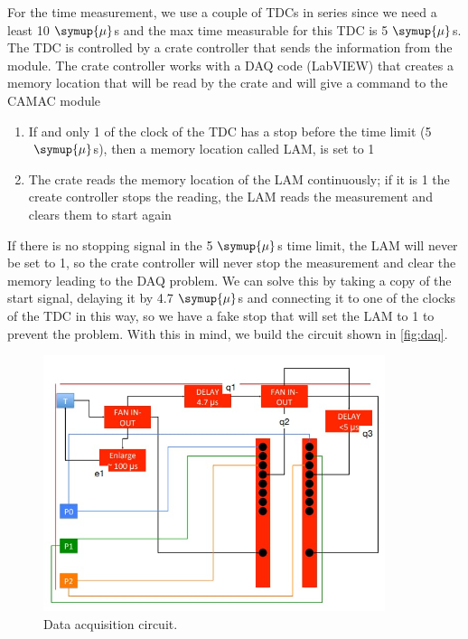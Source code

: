For the time measurement, we use a couple of TDCs in series since we need a least 10$\;\symup{\mu}$s
and the max time measurable for this TDC is 5$\;\symup{\mu}$s.
The TDC is controlled by a crate controller that sends the information 
from the module. The crate controller works with a DAQ code (LabVIEW) 
that creates a memory location that will be read by the crate and will give a command to the
CAMAC module
\begin{enumerate}
  \item If and only 1 of the clock of the TDC has a stop before the time limit (5$\;\symup{\mu}$s), then a memory location called LAM, is set to 1
  \item The crate reads the memory location of the LAM continuously; if it is 1 the create controller stops the reading, the LAM reads the measurement and clears them to start again
\end{enumerate}
 If there is no stopping signal in the 5$\;\symup{\mu}$s time limit, the LAM will never be set to 1, so the crate controller will never stop the measurement and clear the memory leading to the DAQ problem. We can solve this by taking a copy of the start signal, delaying it by 4.7$\;\symup{\mu}$s and connecting it to one of the clocks of the TDC in this way, so we have
a fake stop that will set the LAM to 1 to prevent the problem. With this in mind, we build the circuit shown in \autoref{fig:daq}.\\
\begin{figure}[h]
\begin{center}
\includegraphics[width=100mm]{figures/cattura4.png}
\end{center}
\caption{Data acquisition circuit.}
\label{fig:daq}
\end{figure}

